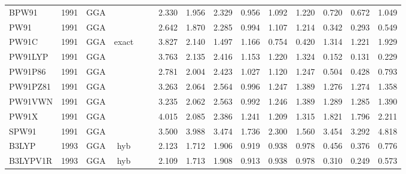 \begin{landscape}
\begin{longtable}{lcccccrrrrrrrrr}
    BPW91            & 1991 & GGA  &          &             &           & 2.330             & 1.956             & 2.329  & 0.956              & 1.092             & 1.220  & 0.720   & 0.672 & 1.049 \\
    PW91             & 1991 & GGA  &          &             &           & 2.642             & 1.870             & 2.285  & 0.994              & 1.107             & 1.214  & 0.342   & 0.293 & 0.549 \\
    PW91C            & 1991 & GGA  & exact    &             &           & 3.827             & 2.140             & 1.497  & 1.166              & 0.754             & 0.420  & 1.314   & 1.221 & 1.929 \\
    PW91LYP          & 1991 & GGA  &          &             &           & 3.763             & 2.135             & 2.416  & 1.153              & 1.220             & 1.324  & 0.152   & 0.131 & 0.229 \\
    PW91P86          & 1991 & GGA  &          &             &           & 2.781             & 2.004             & 2.423  & 1.027              & 1.120             & 1.247  & 0.504   & 0.428 & 0.793 \\
    PW91PZ81         & 1991 & GGA  &          &             &           & 3.263             & 2.064             & 2.564  & 0.996              & 1.247             & 1.389  & 1.276   & 1.274 & 1.358 \\
    PW91VWN          & 1991 & GGA  &          &             &           & 3.235             & 2.062             & 2.563  & 0.992              & 1.246             & 1.389  & 1.289   & 1.285 & 1.390 \\
    PW91X            & 1991 & GGA  &          &             &           & 4.015             & 2.085             & 2.386  & 1.241              & 1.209             & 1.315  & 1.821   & 1.796 & 2.211 \\
    SPW91            & 1991 & GGA  &          &             &           & 3.500             & 3.988             & 3.474  & 1.736              & 2.300             & 1.560  & 3.454   & 3.292 & 4.818 \\
    B3LYP            & 1993 & GGA  & hyb      &             &           & 2.123             & 1.712             & 1.906  & 0.919              & 0.938             & 0.978  & 0.456   & 0.376 & 0.776 \\
    B3LYPV1R         & 1993 & GGA  & hyb      &             &           & 2.109             & 1.713             & 1.908  & 0.913              & 0.938             & 0.978  & 0.310   & 0.249 & 0.573 \\

\end{longtable}
\end{landscape}
